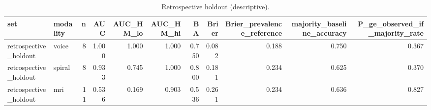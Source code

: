 \begin{table}
\caption{Retrospective holdout (descriptive).}
\label{tab:table5_holdout}
\begin{tabular}{llrrrrrrrrr}
\toprule
set & modality & n & AUC & AUC_HM_lo & AUC_HM_hi & BA & Brier & Brier_prevalence_reference & majority_baseline_accuracy & P_ge_observed_if_majority_rate \\
\midrule
retrospective_holdout & voice & 8 & 1.000 & 1.000 & 1.000 & 0.750 & 0.082 & 0.188 & 0.750 & 0.367 \\
retrospective_holdout & spiral & 8 & 0.933 & 0.745 & 1.000 & 0.800 & 0.181 & 0.234 & 0.625 & 0.370 \\
retrospective_holdout & mri & 11 & 0.536 & 0.169 & 0.903 & 0.536 & 0.261 & 0.234 & 0.636 & 0.827 \\
\bottomrule
\end{tabular}
\end{table}

